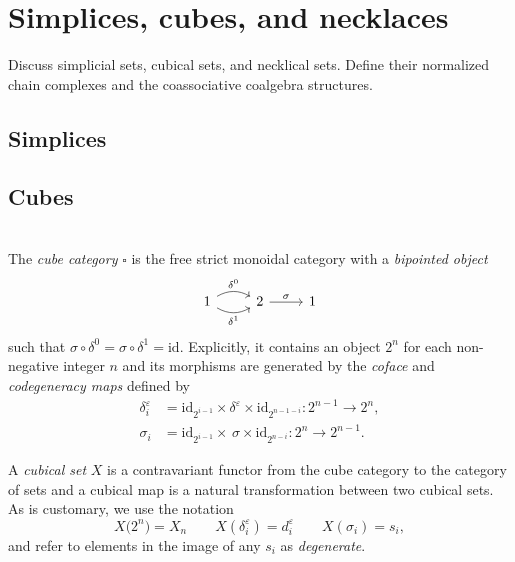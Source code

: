 \section{Simplices, cubes, and necklaces}

Discuss simplicial sets, cubical sets, and necklical sets. Define their normalized chain complexes and the coassociative coalgebra structures.

\subsection{Simplices}

\subsection{Cubes}\ \\

The \textit{cube category} $\square$ is the free strict monoidal category with a \textit{bipointed object}
\begin{equation*}
\begin{tikzcd}
1 \arrow[r, bend left, "\delta^0"] \arrow[r, bend right, "\delta^1"'] & 2 \arrow[r, "\sigma"] & 1
\end{tikzcd}
\end{equation*}
such that $\sigma \circ \delta^0 = \sigma \circ \delta^1 = \mathrm{id}$. Explicitly, it contains an object $2^n$ for each non-negative integer $n$ and its morphisms are generated by the \textit{coface} and \textit{codegeneracy maps} defined by
\begin{align*}
\delta_i^\varepsilon & = \mathrm{id}_{2^{i-1}} \times \delta^\varepsilon \times \mathrm{id}_{2^{n-1-i}} \colon 2^{n-1} \to 2^n, \\
\sigma_i & = \mathrm{id}_{2^{i-1}} \times \, \sigma \times \mathrm{id}_{2^{n-i}} \colon 2^{n} \to 2^{n-1}.
\end{align*}

A \textit{cubical set} $X$ is a contravariant functor from the cube category to the category of sets and a cubical map is a natural transformation between two cubical sets. As is customary, we use the notation
\begin{equation*}
X\big( 2^n \big) = X_n \qquad X(\delta^\varepsilon_i) = d^\varepsilon_i \qquad X(\sigma_i) = s_i,
\end{equation*}
and refer to elements in the image of any $s_i$ as \textit{degenerate}.


